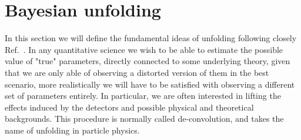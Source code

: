 \section{Bayesian unfolding}

In this section we will define the fundamental ideas of unfolding following closely Ref.~\cite{DAgostini:1994fjx, dagostini2010improved}.
In any quantitative science we wish to be able to estimate the possible value of "true" parameters, directly connected to some underlying theory, given that we are only able of observing a distorted version of them in the best scenario, more realistically we will have to be satisfied with observing a different set of parameters entirely.
In particular, we are often interested in lifting the effects induced by the detectors and possible physical and theoretical backgrounds. This procedure is normally called de-convolution, and takes the name of unfolding in particle physics.

